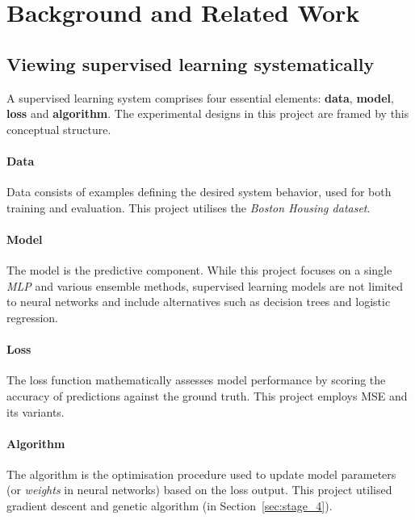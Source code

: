 \documentclass{article}
\begin{document}
\section{Background and Related Work}


\subsection{Viewing supervised learning systematically}
A supervised learning system comprises four essential elements: \textbf{data}, \textbf{model}, \textbf{loss} and \textbf{algorithm}. The experimental designs in this project are framed by this conceptual structure. 

\paragraph{Data}
Data consists of examples defining the desired system behavior, used for both training and evaluation. This project utilises the \textit{Boston Housing dataset}. 

\paragraph{Model}
The model is the predictive component. While this project focuses on a single \textit{MLP} and various ensemble methods, supervised learning models are not limited to neural networks and include alternatives such as decision trees and logistic regression. 

\paragraph{Loss}
The loss function mathematically assesses model performance by scoring the accuracy of predictions against the ground truth. This project employs MSE and its variants. 

\paragraph{Algorithm}
The algorithm is the optimisation procedure used to update model parameters (or \textit{weights} in neural networks) based on the loss output. This project utilised gradient descent and genetic algorithm (in Section~\ref{sec:stage_4}). 
\end{document}
